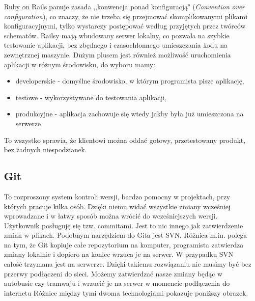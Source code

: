   Ruby on Rails panuje zasada ,,konwencja ponad konfiguracją" (\emph{Convention over configuration}), co znaczy, że nie trzeba się przejmować skomplikowanymi plikami konfiguracyjnymi, tylko wystarczy postępować według przyjętych przez twórców schematów. Railsy mają wbudowany serwer lokalny, co pozwala na szybkie testowanie aplikacji, bez zbędnego i czasochłonnego umieszczania kodu na zewnętrznej maszynie. Dużym plusem jest również możliwość uruchomienia aplikacji w różnym środowisku, do wyboru mamy:
  \begin{itemize}
    \item developerskie - domyślne środowisko, w którym programista pisze aplikację,
    \item testowe - wykorzystywane do testowania aplikacji,
    \item produkcyjne - aplikacja zachowuje się wtedy jakby była już umieszczona na serwerze
  \end{itemize}
  To wszystko sprawia, że klientowi można oddać gotowy, przetestowany produkt, bez żadnych niespodzianek.

  \subsection{Git}
   \label{sec:GIT}
  To rozproszony system kontroli wersji, bardzo pomocny w projektach, przy których pracuje kilka osób. Dzięki niemu widać wszystkie zmiany wcześniej wprowadzane i w łatwy sposób można wrócić do wcześniejszych wersji. Użytkownik posługuję się tzw. commitami. Jest to nic innego jak zatwierdzenie zmian w plikach. Podobnym narzędziem do Gita jest SVN. Różnica m.in. polega na tym, że Git kopiuje całe repozytorium na komputer, programista zatwierdza zmiany lokalnie i dopiero na koniec wrzuca je na serwer. W przypadku SVN całość trzymana jest na serwerze.
  Dzięki takiemu rozwiązaniu nie musimy być bez przerwy podłączeni do sieci. Możemy zatwierdzać nasze zmiany będąc w autobusie czy tramwaju i wrzucić je na serwer w momencie podłączenia do internetu
  Różnice między tymi dwoma technologiami pokazuje poniższy obrazek.

